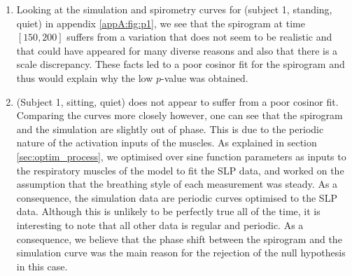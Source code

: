\begin{enumerate}
\item Looking at the simulation and spirometry curves for (subject 1, standing, quiet) in appendix \ref{appA:fig:p1}, we see that the spirogram at time $[150, 200]$ suffers from a variation that does not seem to be realistic and that could have appeared for many diverse reasons and also that there is a scale discrepancy. These facts led to a poor cosinor fit for the spirogram and thus would explain why the low $p$-value was obtained.

\item (Subject 1, sitting, quiet) does not appear to suffer from a poor cosinor fit. Comparing the curves more closely however, one can see that the spirogram and the simulation are slightly out of phase. This is due to the periodic nature of the activation inputs of the muscles. As explained in section \ref{sec:optim_process}, we optimised over sine function parameters as inputs to the respiratory muscles of the model to fit the SLP data, and worked on the assumption that the breathing style of each measurement was steady. As a consequence, the simulation data are periodic curves optimised to the SLP data. Although this is unlikely to be perfectly true all of the time, it is interesting to note that all other data is regular and periodic. As a consequence, we believe that the phase shift between the spirogram and the simulation curve was the main reason for the rejection of the null hypothesis in this case.


\end{enumerate}
